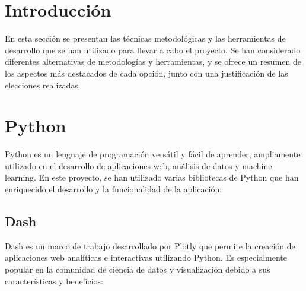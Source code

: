 
\section{Introducción}

En esta sección se presentan las técnicas metodológicas y las herramientas de desarrollo que se han utilizado para llevar a cabo el proyecto. Se han considerado diferentes alternativas de metodologías y herramientas, y se ofrece un resumen de los aspectos más destacados de cada opción, junto con una justificación de las elecciones realizadas.

\section{Python}

Python es un lenguaje de programación versátil y fácil de aprender, ampliamente utilizado en el desarrollo de aplicaciones web, análisis de datos y machine learning. En este proyecto, se han utilizado varias bibliotecas de Python que han enriquecido el desarrollo y la funcionalidad de la aplicación:

\subsection{Dash}

Dash es un marco de trabajo desarrollado por Plotly que permite la creación de aplicaciones web analíticas e interactivas utilizando Python. Es especialmente popular en la comunidad de ciencia de datos y visualización debido a sus características y beneficios:
    
